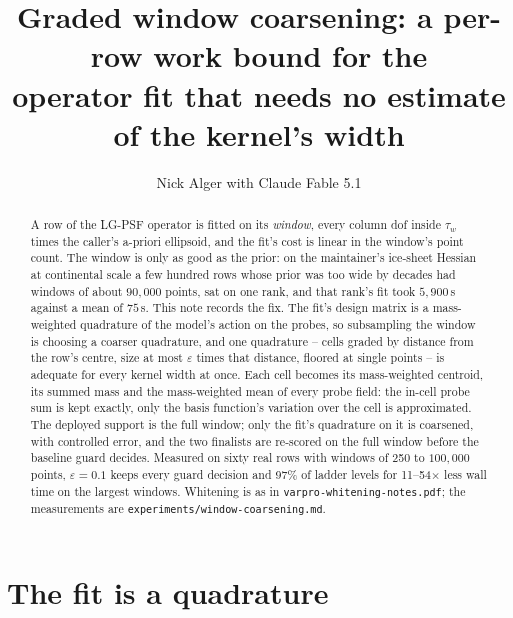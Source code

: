 \documentclass[11pt]{article}
\title{Graded window coarsening: a per-row work bound for the\\
       operator fit that needs no estimate of the kernel's width}
\author{Nick Alger with Claude Fable 5.1}
\date{}
\newcommand{\eps}{\varepsilon}
\newcommand{\code}[1]{\texttt{#1}}
\begin{document}
\maketitle

\begin{abstract}
\noindent
A row of the LG-PSF operator is fitted on its \emph{window}, every column
dof inside $\tau_w$ times the caller's a-priori ellipsoid, and the fit's cost
is linear in the window's point count. The window is only as good as the
prior: on the maintainer's ice-sheet Hessian at continental scale a few
hundred rows whose prior was too wide by decades had windows of about
$90{,}000$ points, sat on one rank, and that rank's fit took $5{,}900$\,s
against a mean of $75$\,s. This note records the fix. The fit's design
matrix is a mass-weighted quadrature of the model's action on the probes, so
subsampling the window is choosing a coarser quadrature, and one quadrature
-- cells graded by distance from the row's centre, size at most $\eps$ times
that distance, floored at single points -- is adequate for every kernel width
at once. Each cell becomes its mass-weighted centroid, its summed mass and
the mass-weighted mean of every probe field: the in-cell probe sum is kept
exactly, only the basis function's variation over the cell is approximated.
The deployed support is the full window; only the fit's quadrature on it is
coarsened, with controlled error, and the two finalists are re-scored on the
full window before the baseline guard decides. Measured on sixty real rows
with windows of 250 to $100{,}000$ points, $\eps = 0.1$ keeps every guard
decision and 97\% of ladder levels for 11--54$\times$ less wall time on the
largest windows. Whitening is as in \code{varpro-whitening-notes.pdf}; the
measurements are \code{experiments/window-coarsening.md}.
\end{abstract}

\section{The fit is a quadrature}
\end{document}
